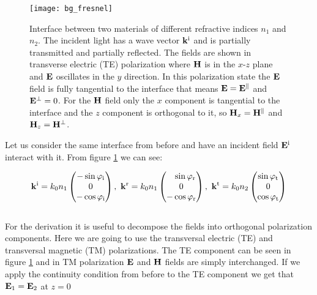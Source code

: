 \begin{figure}[H]
    \centering
    \texttt{[image: bg\_fresnel]}
    \caption{Interface between two materials of different refractive indices $n_1$ and $n_2$. The incident light has a wave vector $\vb k^{\mathrm{i}}$ and is partially transmitted and partially reflected. The fields are shown in transverse electric (TE) polarization where $\vb H$ is in the $x$-$z$ plane and $\vb E$ oscillates in the $y$ direction.
    In this polarization state the $\vb E$ field is fully tangential to the interface that means 
    $\vb E = \vb E^\parallel$ and $\vb E^\bot = 0$.
    For the $\vb H$ field only the $x$ component is tangential to the interface and the $z$ component is orthogonal to it, so 
    $\vb H_x = \vb H^\parallel$ and $\vb H_z = \vb H^\bot$.}
    \label{fig:bg:fresnel}
\end{figure}

Let us consider the same interface from before and have an incident field
$\vb E^{\mathrm{i}}$ interact with it. From figure \ref{fig:bg:fresnel} we can see:

\begin{equation} \label{eq:bg:k}
    \vb k^{\mathrm{i}} = k_0 n_1
    \begin{pmatrix}
        -\sin \varphi_{\mathrm{i}}\\ 0\\ -\cos \varphi_{\mathrm{i}}
    \end{pmatrix}
    , \
    \vb k^{\mathrm{r}} = k_0 n_1
    \begin{pmatrix}
        \phantom{-} \sin \varphi_{\mathrm{r}} \\ 0\\ -\cos \varphi_{\mathrm{r}}
    \end{pmatrix}
    , \
    \vb k^{\mathrm{t}} = k_0 n_2
    \begin{pmatrix}
        \sin \varphi_{\mathrm{t}}\\ 0\\ \cos \varphi_{\mathrm{t}}
    \end{pmatrix}
\end{equation} 
\\

For the derivation it is useful to decompose the fields into orthogonal polarization components. Here we are going to use the transversal electric (TE) and transversal magnetic (TM) polarizations. The TE component can be seen in figure \ref{fig:bg:fresnel} and in TM polarization $\vb E$ and $\vb H$ fields are simply interchanged.
If we apply the continuity condition from before to the TE component we get that $\vb E_1 = \vb E_2$ at $z = 0$

